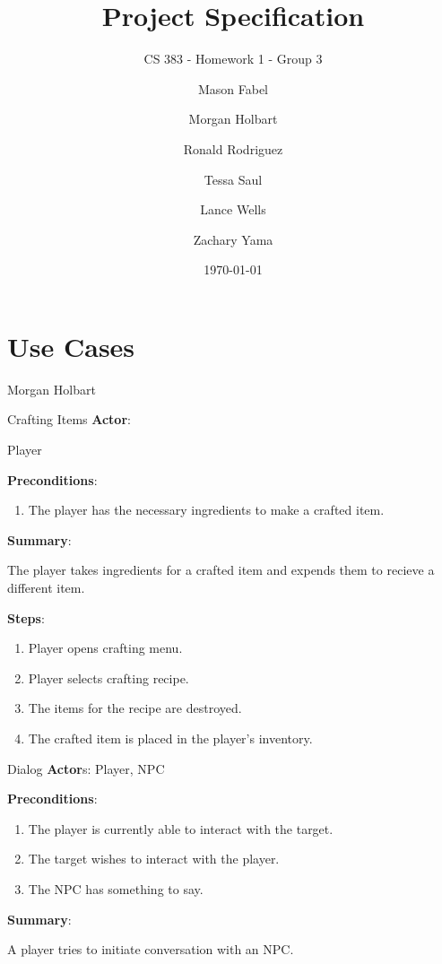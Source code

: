 \documentclass[12pt]{report}
\title{Project Specification}
\subtitle{CS 383 - Homework 1 - Group 3}
\author{
Mason Fabel \\
\and Morgan Holbart \\
\and Ronald Rodriguez \\
\and Tessa Saul \\
\and Lance Wells \\
\and Zachary Yama \\
}
\date{\today}
\begin{document}
\maketitle

\chapter{Use Cases}

\begin{section}{Morgan Holbart}
\begin{subsection}{Crafting Items}
\textbf{Actor}:

Player

\textbf{Preconditions}:

\begin{enumerate}
\item The player has the necessary ingredients to make a crafted item.
\end{enumerate}

\textbf{Summary}:

The player takes ingredients for a crafted item and expends them to
recieve a different item.

\textbf{Steps}:

\begin{enumerate}
\item Player opens crafting menu.
\item Player selects crafting recipe.
\item The items for the recipe are destroyed.
\item The crafted item is placed in the player's inventory.
\end{enumerate}
\end{subsection}

\begin{subsection}{Dialog}
\textbf{Actor}s: Player, NPC

\textbf{Preconditions}:

\begin{enumerate}
\item The player is currently able to interact with the target.
\item The target wishes to interact with the player.
\item The NPC has something to say.
\end{enumerate}

\textbf{Summary}:

A player tries to initiate conversation with an NPC.


\end{subsection}
\end{section}
\end{document}
